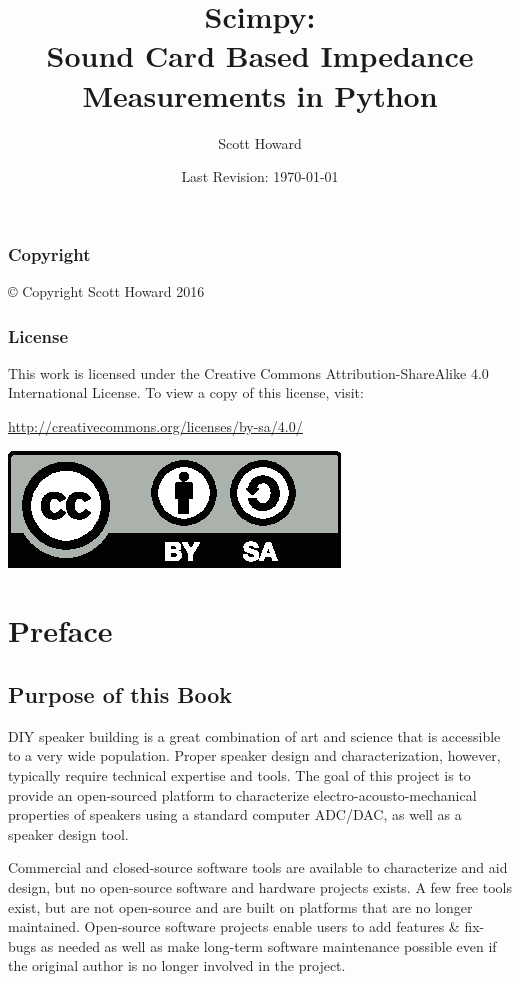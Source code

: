 \documentclass[10pt]{book}
\author{Scott Howard}
\title{Scimpy:\\ \textbf{S}ound \textbf{C}ard Based \textbf{I}mpedance \textbf{M}easurements in \textbf{Py}thon}
\date{Last Revision: \today}
\begin{document}
\frontmatter

\maketitle
\null
\vfill
\subsection*{Copyright}
© Copyright Scott Howard 2016

\subsection*{License}
This work is licensed under the Creative Commons Attribution-ShareAlike 4.0 International License. To view a copy of this license, visit:
\begin{center}
\url{http://creativecommons.org/licenses/by-sa/4.0/}

\includegraphics[scale=1]{cc-by-sa.eps}
\end{center}



\tableofcontents


\chapter{Preface}
\section*{Purpose of this Book}
DIY speaker building is a great combination of art and science that is accessible to a very wide population. Proper speaker design and characterization, however, typically require technical expertise and tools. The goal of this project is to provide an open-sourced platform to characterize electro-acousto-mechanical properties of speakers using a standard computer ADC/DAC, as well as a speaker design tool.

Commercial and closed-source software tools are available to characterize and aid design, but no open-source software and hardware projects exists. A few free tools exist, but are not open-source and are built on platforms that are no longer maintained. Open-source software projects enable users to add features \& fix-bugs as needed as well as make long-term software maintenance possible even if the original author is no longer involved in the project.
\end{document}
